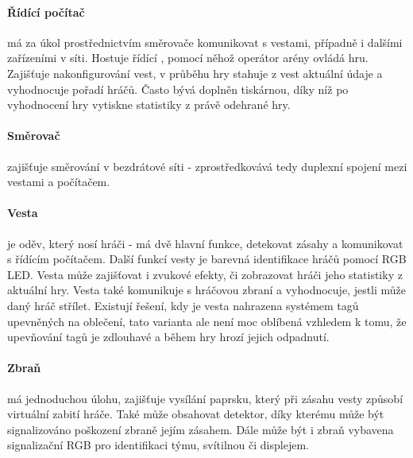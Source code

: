 \paragraph{Řídící počítač}
má za úkol prostřednictvím směrovače komunikovat s vestami, případně i dalšími zařízeními v síti. Hostuje řídící , pomocí něhož operátor arény ovládá hru. Zajišťuje nakonfigurování vest, v průběhu hry stahuje z vest aktuální údaje a vyhodnocuje pořadí hráčů. Často bývá doplněn tiskárnou, díky níž po vyhodnocení hry vytiskne statistiky z právě odehrané hry.

\paragraph{Směrovač}
zajišťuje směrování v bezdrátové síti - zprostředkovává tedy duplexní spojení mezi vestami a počítačem.

\paragraph{Vesta}
je oděv, který nosí hráči - má dvě hlavní funkce, detekovat zásahy a komunikovat s řídícím počítačem. Další funkcí vesty je barevná identifikace hráčů pomocí RGB LED. Vesta může zajišťovat i zvukové efekty, či zobrazovat hráči jeho statistiky z aktuální hry. Vesta také komunikuje s hráčovou zbraní a vyhodnocuje, jestli může daný hráč střílet. Existují řešení, kdy je vesta nahrazena systémem tagů upevněných na oblečení, tato varianta ale není moc oblíbená vzhledem k tomu, že upevňování tagů je zdlouhavé a během hry hrozí jejich odpadnutí.

\paragraph{Zbraň}
má jednoduchou úlohu, zajišťuje vysílání  paprsku, který při zásahu vesty způsobí virtuální zabití hráče. Také může obsahovat  detektor, díky kterému může být signalizováno poškození zbraně jejím zásahem. Dále může být i zbraň vybavena signalizační RGB  pro identifikaci týmu, svítilnou či displejem.

